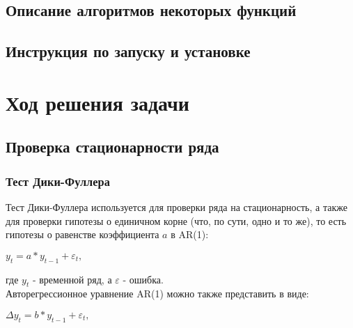 \documentclass{article}
\begin{document}
  \subsection{Описание алгоритмов некоторых функций}
  
  \subsection{Инструкция по запуску и установке}
  
\newpage  
  
\section{Ход решения задачи}

  \subsection{Проверка стационарности ряда}
    
    \subsubsection{Тест Дики-Фуллера}
    
    Тест Дики-Фуллера используется для проверки ряда на стационарность, а также для проверки гипотезы о единичном корне (что, по сути, одно и то же), то есть гипотезы о равенстве коэффициента $a$ в AR(1):
    
    $y_t = a*y_{t-1} + \varepsilon_t,$
    
    где $y_t$ - временной ряд, а $\varepsilon$ - ошибка.
    \\
    Авторегрессионное уравнение AR(1) можно также представить в виде:
    
    $\Delta{y_t} = b*y_{t-1} + \varepsilon_t,$
    
\end{document}
